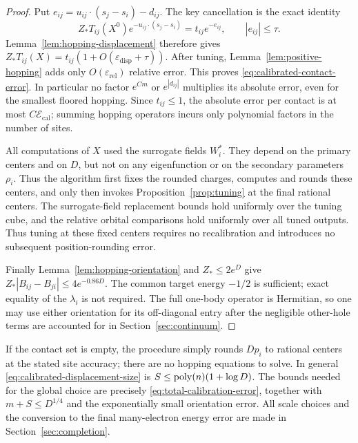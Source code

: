 \begin{proof}
Put $e_{ij}=u_{ij}\cdot(s_j-s_i)-d_{ij}$.  The key cancellation
is the exact identity
\begin{equation}
 Z_*T_{ij}(X^0)e^{-u_{ij}\cdot(s_j-s_i)}
    =t_{ij}e^{-e_{ij}},\qquad |e_{ij}|\le\tau.
 \label{eq:exact-calibration-identity}
\end{equation}
Lemma~\ref{lem:hopping-displacement} therefore gives
$Z_*T_{ij}(X)=t_{ij}(1+O(\varepsilon_{\mathrm{disp}}+\tau))$.
After tuning, Lemma~\ref{lem:positive-hopping} adds only
$O(\varepsilon_{\mathrm{rel}})$ relative error.  This proves
\eqref{eq:calibrated-contact-error}.  In particular no factor
$e^{Cm}$ or $e^{|d_{ij}|}$ multiplies its absolute error, even
for the smallest floored hopping.  Since $t_{ij}\le1$, the
absolute error per contact is at most $C\mathcal E_{\mathrm{cal}}$;
summing hopping operators incurs only polynomial factors in
the number of sites.

All computations of $X$ used the surrogate fields $W_i^*$.
They depend on the primary centers and on $D$, but not on any
eigenfunction or on the secondary parameters $\rho_i$.  Thus
the algorithm first fixes the rounded charges, computes and
rounds these centers, and only then invokes
Proposition~\ref{prop:tuning} at the final rational centers.
The surrogate-field replacement bounds hold uniformly over the
tuning cube, and the relative orbital comparisons hold uniformly
over all tuned outputs. Thus tuning at these fixed centers requires
no recalibration and introduces no subsequent position-rounding error.

Finally Lemma~\ref{lem:hopping-orientation} and $Z_*\le2e^D$
give $Z_*|B_{ij}-B_{ji}|\le4e^{-0.86D}$.  The common target
energy $-1/2$ is sufficient; exact equality of the $\lambda_i$
is not required.  The full one-body operator is Hermitian, so
one may use either orientation for its off-diagonal entry after
the negligible other-hole terms are accounted for in
Section~\ref{sec:continuum}.
\end{proof}

If the contact set is empty, the procedure simply rounds $Dp_i$
to rational centers at the stated site accuracy; there are no
hopping equations to solve.  In general
\eqref{eq:calibrated-displacement-size} is
$S\le\operatorname{poly}(n)(1+\log D)$.  The bounds needed for the global
choice are precisely \eqref{eq:total-calibration-error}, together
with $m+S\le D^{1/4}$ and the exponentially small orientation
error.  All scale choices and the conversion to the final
many-electron energy error are made in
Section~\ref{sec:completion}.
